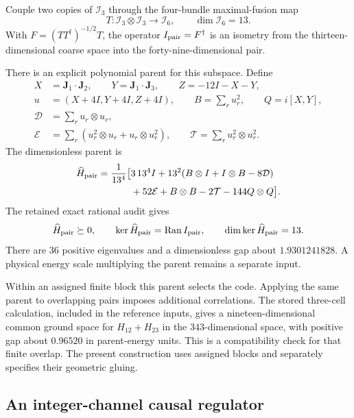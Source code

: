Couple two copies of $\mathcal I_3$ through the four-bundle maximal-fusion map
\begin{equation}
T:\mathcal I_3\otimes\mathcal I_3\longrightarrow\mathcal I_6,
\qquad \dim\mathcal I_6=13.
\end{equation}
With $F=(TT^\dagger)^{-1/2}T$, the operator $I_{\rm pair}=F^\dagger$ is an isometry from the thirteen-dimensional coarse space into the forty-nine-dimensional pair.

There is an explicit polynomial parent for this subspace. Define
\begin{align}
X&=\mathbf J_1\cdot\mathbf J_2,\qquad
Y=\mathbf J_1\cdot\mathbf J_3,\qquad Z=-12I-X-Y,\\
u&=(X+4I,Y+4I,Z+4I),\qquad B=\sum_ru_r^2,\qquad Q=i[X,Y],\\
\mathcal D&=\sum_ru_r\otimes u_r,\\
\mathcal E&=\sum_r(u_r^2\otimes u_r+u_r\otimes u_r^2),\qquad
\mathcal T=\sum_ru_r^2\otimes u_r^2.
\end{align}
The dimensionless parent is
\begin{equation}
\begin{split}
\widehat H_{\rm pair}=\frac1{13^4}\big[
&3\,13^4I+13^2(B\otimes I+I\otimes B-8\mathcal D)\\
&+52\mathcal E+B\otimes B-2\mathcal T-144Q\otimes Q
\big].
\end{split}
\label{eq:pairparent}
\end{equation}
The retained exact rational audit gives
\begin{equation}
\widehat H_{\rm pair}\succeq0,\qquad
\ker\widehat H_{\rm pair}=\operatorname{Ran} I_{\rm pair},
\qquad \dim\ker\widehat H_{\rm pair}=13.
\end{equation}
There are $36$ positive eigenvalues and a dimensionless gap about $1.9301241828$. A physical energy scale multiplying the parent remains a separate input.

Within an assigned finite block this parent selects the code. Applying the same parent to overlapping pairs imposes additional correlations. The stored three-cell calculation, included in the reference inputs, gives a nineteen-dimensional common ground space for $H_{12}+H_{23}$ in the $343$-dimensional space, with positive gap about $0.96520$ in parent-energy units. This is a compatibility check for that finite overlap. The present construction uses assigned blocks and separately specifies their geometric gluing.

\subsection{An integer-channel causal regulator}

